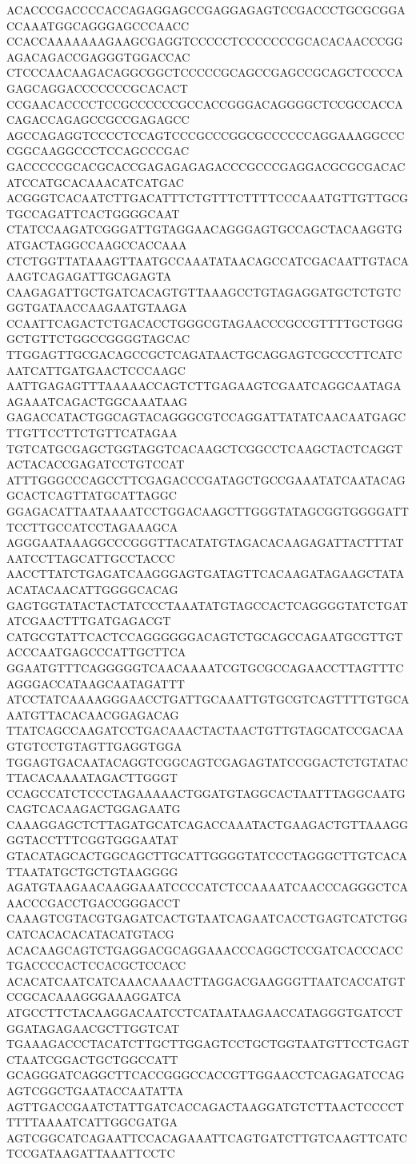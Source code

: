 ACACCCGACCCCACCAGAGGAGCCGAGGAGAGTCCGACCCTGCGCGGACCAAATGGCAGGGAGCCCAACC
CCACCAAAAAAAGAAGCGAGGTCCCCCTCCCCCCCGCACACAACCCGGAGACAGACCGAGGGTGGACCAC
CTCCCAACAAGACAGGCGGCTCCCCCGCAGCCGAGCCGCAGCTCCCCAGAGCAGGACCCCCCCGCACACT
CCGAACACCCCTCCGCCCCCCGCCACCGGGACAGGGGCTCCGCCACCACAGACCAGAGCCGCCGAGAGCC
AGCCAGAGGTCCCCTCCAGTCCCGCCCGGCGCCCCCCAGGAAAGGCCCCGGCAAGGCCCTCCAGCCCGAC
GACCCCCGCACGCACCGAGAGAGAGACCCGCCCGAGGACGCGCGACACATCCATGCACAAACATCATGAC
ACGGGTCACAATCTTGACATTTCTGTTTCTTTTCCCAAATGTTGTTGCGTGCCAGATTCACTGGGGCAAT
CTATCCAAGATCGGGATTGTAGGAACAGGGAGTGCCAGCTACAAGGTGATGACTAGGCCAAGCCACCAAA
CTCTGGTTATAAAGTTAATGCCAAATATAACAGCCATCGACAATTGTACAAAGTCAGAGATTGCAGAGTA
CAAGAGATTGCTGATCACAGTGTTAAAGCCTGTAGAGGATGCTCTGTCGGTGATAACCAAGAATGTAAGA
CCAATTCAGACTCTGACACCTGGGCGTAGAACCCGCCGTTTTGCTGGGGCTGTTCTGGCCGGGGTAGCAC
TTGGAGTTGCGACAGCCGCTCAGATAACTGCAGGAGTCGCCCTTCATCAATCATTGATGAACTCCCAAGC
AATTGAGAGTTTAAAAACCAGTCTTGAGAAGTCGAATCAGGCAATAGAAGAAATCAGACTGGCAAATAAG
GAGACCATACTGGCAGTACAGGGCGTCCAGGATTATATCAACAATGAGCTTGTTCCTTCTGTTCATAGAA
TGTCATGCGAGCTGGTAGGTCACAAGCTCGGCCTCAAGCTACTCAGGTACTACACCGAGATCCTGTCCAT
ATTTGGGCCCAGCCTTCGAGACCCGATAGCTGCCGAAATATCAATACAGGCACTCAGTTATGCATTAGGC
GGAGACATTAATAAAATCCTGGACAAGCTTGGGTATAGCGGTGGGGATTTCCTTGCCATCCTAGAAAGCA
AGGGAATAAAGGCCCGGGTTACATATGTAGACACAAGAGATTACTTTATAATCCTTAGCATTGCCTACCC
AACCTTATCTGAGATCAAGGGAGTGATAGTTCACAAGATAGAAGCTATAACATACAACATTGGGGCACAG
GAGTGGTATACTACTATCCCTAAATATGTAGCCACTCAGGGGTATCTGATATCGAACTTTGATGAGACGT
CATGCGTATTCACTCCAGGGGGGACAGTCTGCAGCCAGAATGCGTTGTACCCAATGAGCCCATTGCTTCA
GGAATGTTTCAGGGGGTCAACAAAATCGTGCGCCAGAACCTTAGTTTCAGGGACCATAAGCAATAGATTT
ATCCTATCAAAAGGGAACCTGATTGCAAATTGTGCGTCAGTTTTGTGCAAATGTTACACAACGGAGACAG
TTATCAGCCAAGATCCTGACAAACTACTAACTGTTGTAGCATCCGACAAGTGTCCTGTAGTTGAGGTGGA
TGGAGTGACAATACAGGTCGGCAGTCGAGAGTATCCGGACTCTGTATACTTACACAAAATAGACTTGGGT
CCAGCCATCTCCCTAGAAAAACTGGATGTAGGCACTAATTTAGGCAATGCAGTCACAAGACTGGAGAATG
CAAAGGAGCTCTTAGATGCATCAGACCAAATACTGAAGACTGTTAAAGGGGTACCTTTCGGTGGGAATAT
GTACATAGCACTGGCAGCTTGCATTGGGGTATCCCTAGGGCTTGTCACATTAATATGCTGCTGTAAGGGG
AGATGTAAGAACAAGGAAATCCCCATCTCCAAAATCAACCCAGGGCTCAAACCCGACCTGACCGGGACCT
CAAAGTCGTACGTGAGATCACTGTAATCAGAATCACCTGAGTCATCTGGCATCACACACATACATGTACG
ACACAAGCAGTCTGAGGACGCAGGAAACCCAGGCTCCGATCACCCACCTGACCCCACTCCACGCTCCACC
ACACATCAATCATCAAACAAAACTTAGGACGAAGGGTTAATCACCATGTCCGCACAAAGGGAAAGGATCA
ATGCCTTCTACAAGGACAATCCTCATAATAAGAACCATAGGGTGATCCTGGATAGAGAACGCTTGGTCAT
TGAAAGACCCTACATCTTGCTTGGAGTCCTGCTGGTAATGTTCCTGAGTCTAATCGGACTGCTGGCCATT
GCAGGGATCAGGCTTCACCGGGCCACCGTTGGAACCTCAGAGATCCAGAGTCGGCTGAATACCAATATTA
AGTTGACCGAATCTATTGATCACCAGACTAAGGATGTCTTAACTCCCCTTTTTAAAATCATTGGCGATGA
AGTCGGCATCAGAATTCCACAGAAATTCAGTGATCTTGTCAAGTTCATCTCCGATAAGATTAAATTCCTC
